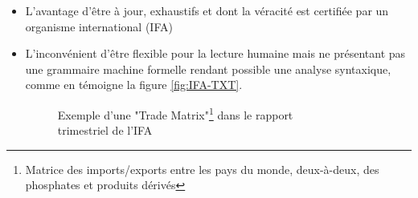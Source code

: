 		\begin{itemize}
		\item L'avantage d’être à jour, exhaustifs et dont la véracité est certifiée par un organisme international (IFA)
		\item L’inconvénient d’être flexible pour la lecture humaine mais ne présentant pas une grammaire machine formelle rendant possible une analyse syntaxique, comme en témoigne la figure \ref{fig:IFA-TXT}.
			\begin{figure}[H]
			    		\raggedright
		    			\captionsetup{justification=raggedright,
		    			singlelinecheck=false
		    			}
			    		\caption{Exemple d'une "Trade Matrix"\protect\footnote{Matrice des imports/exports entre les pays du monde, deux-à-deux, des phosphates et produits dérivés} dans le rapport\\trimestriel de l'IFA}
			    		\label{fig:IFA-PDF}
			\end{figure}	
		\end{itemize}
		
